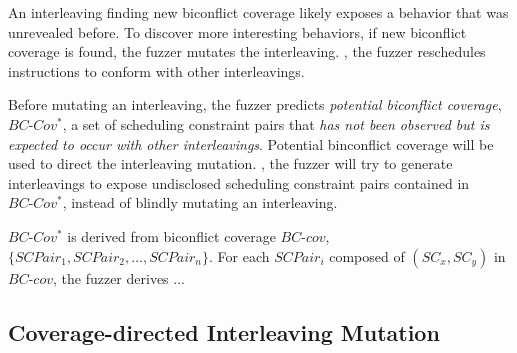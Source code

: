 %
An interleaving finding new biconflict coverage likely exposes a
behavior that was unrevealed before.
%
To discover more interesting behaviors, if new biconflict coverage is
found, the fuzzer mutates the interleaving. \ie, the fuzzer
reschedules instructions to conform with other interleavings.

Before mutating an interleaving, the fuzzer predicts \textit{potential
  biconflict coverage}, $BC\mbox{-}Cov^*$, a set of scheduling
constraint pairs that \textit{has not been observed but is expected to
  occur with other interleavings}.
%
Potential binconflict coverage will be used to direct the interleaving
mutation. \ie, the fuzzer will try to generate interleavings to expose
undisclosed scheduling constraint pairs contained in
$BC\mbox{-}Cov^*$, instead of blindly mutating an interleaving.


$BC\mbox{-}Cov^*$ is derived from biconflict coverage $BC\mbox{-}cov$,
$\{SCPair_1, SCPair_2, ..., SCPair_n\}$.
%
For each $SCPair_i$ composed of $(SC_x, SC_y)$ in $BC\mbox{-}cov$, the
fuzzer derives ...



\subsection{Coverage-directed Interleaving Mutation}
\label{ss:scheduler}



\newcommand{\segment}{segment graph\xspace}
\newcommand{\segments}{segment graphs\xspace}
\newcommand{\Segments}{Segment graphs\xspace}


